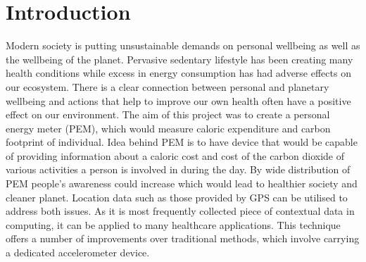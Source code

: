 \documentclass[12pt, a4paper]{report}   %
\begin{document}
\chapter{Introduction}
Modern society is putting unsustainable demands on personal wellbeing as well as the wellbeing of the planet. Pervasive sedentary lifestyle has been creating many health conditions while excess in energy consumption has had adverse effects on our ecosystem. There is a clear connection between personal and planetary wellbeing and actions that help to improve our own health often have a positive effect on our environment. The aim of this project was to create a personal energy meter (PEM), which would measure caloric expenditure and carbon footprint of individual. Idea behind PEM is to have device that would be capable of providing information about a caloric cost and cost of the carbon dioxide of various activities a person is involved in during the day. By wide distribution of PEM people’s awareness could increase which would lead to healthier society and cleaner planet. Location data such as those provided by GPS can be utilised to address both issues. As it is most frequently collected piece of contextual data in computing, it can be applied to many healthcare applications. This technique offers a number of improvements over traditional methods, which involve carrying a dedicated accelerometer device.
\end{document}
